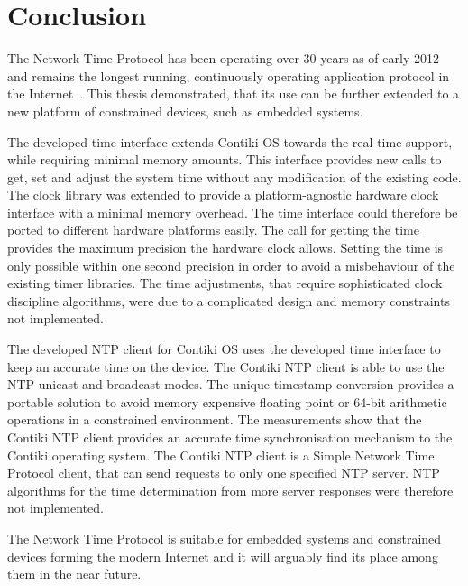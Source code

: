 






\chapter{Conclusion}
The Network Time Protocol has been operating over 30 years as of early 2012
and remains the longest running, continuously operating application
protocol in the Internet~\cite{ntp-y2k}.
This thesis demonstrated, that its use can be further extended to a new platform of constrained devices,
such as embedded systems.

The developed time interface extends Contiki OS towards the real-time support,
while requiring minimal memory amounts.
This interface provides new calls to get, set and adjust the system time without any modification
of the existing code.
The clock library was extended to provide a platform-agnostic hardware clock interface
with a minimal memory overhead.
The time interface could therefore be ported to different hardware platforms easily.
The call for getting the time provides the maximum precision the hardware clock allows.
Setting the time is only possible within one second precision in order to avoid
a misbehaviour of the existing timer libraries.
The time adjustments, that require sophisticated clock discipline algorithms,
were due to a complicated design and memory constraints not implemented.

The developed NTP client for Contiki OS uses the developed time interface to keep an accurate time on the device.
The Contiki NTP client is able to use the NTP unicast and broadcast modes.
The unique timestamp conversion provides a portable solution to avoid
memory expensive floating point or 64-bit arithmetic operations in a constrained environment.
The measurements show that the Contiki NTP client provides an accurate time
synchronisation mechanism to the Contiki operating system.
The Contiki NTP client is a Simple Network Time Protocol client,
that can send requests to only one specified NTP server.
NTP algorithms for the time determination from more server responses were therefore not implemented.

The Network Time Protocol is suitable for embedded systems and constrained devices
forming the modern Internet and it will arguably find its place among them in the near future.






